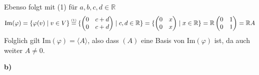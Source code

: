 \documentclass[a4paper,graphics,11pt]{article}
\newcommand{\up}[2]{\mathrel{\overset{\makebox[0pt]{\mbox{\normalfont\tiny #2}}}{#1}}}
\begin{document}
Ebenso folgt mit (1) für $a,b,c,d \in \mathbb{R}$
$$
    \text{Im}(\varphi)
    = \{\varphi(v) \mid v \in V\}
    \up{=}{(1)} \{
    \begin{pmatrix}
        0 & c+d\\
        0 & c+d
    \end{pmatrix}
    \mid c,d \in \mathbb{R}\}
    =\{
    \begin{pmatrix}
        0 & x\\
        0 & x
    \end{pmatrix}
    \mid x \in \mathbb{R}\}
    = \mathbb{R}
    \begin{pmatrix}
        0 & 1\\
        0 & 1
    \end{pmatrix}
    = \mathbb{R}A
$$
Folglich gilt $\text{Im}(\varphi) = \langle A\rangle$, also dass $(A)$ eine Basis von $\text{Im}(\varphi)$ ist,
da auch weiter $A \neq 0$.

\textbf{b)}
\end{document}
